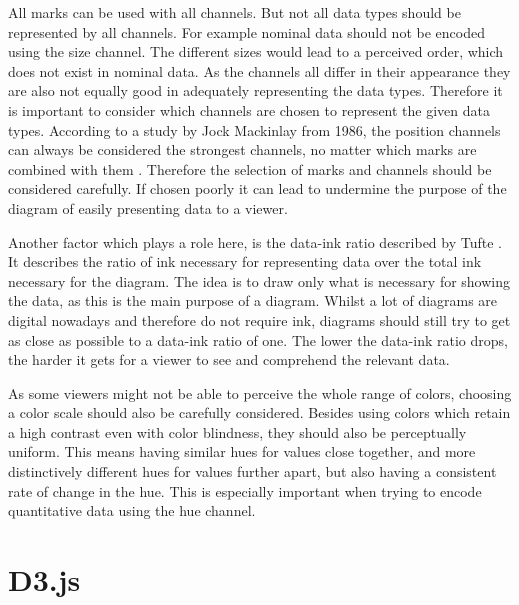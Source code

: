 All marks can be used with all channels. But not all data types should be represented by all channels. For example nominal data should not be encoded using the size channel. The different sizes would lead to a perceived order, which does not exist in nominal data. As the channels all differ in their appearance they are also not equally good in adequately representing the data types. Therefore it is important to consider which channels are chosen to represent the given data types. According to a study by Jock Mackinlay from 1986, the position channels can always be considered the strongest channels, no matter which marks are combined with them \cite{mackinlay1986automating}. Therefore the selection of marks and channels should be considered carefully. If chosen poorly it can lead to undermine the purpose of the diagram of easily presenting data to a viewer.

Another factor which plays a role here, is the data-ink ratio described by Tufte \cite{tufte}. It describes the ratio of ink necessary for representing data over the total ink necessary for the diagram. The idea is to draw only what is necessary for showing the data, as this is the main purpose of a diagram. Whilst a lot of diagrams are digital nowadays and therefore do not require ink, diagrams should still try to get as close as possible to a data-ink ratio of one. The lower the data-ink ratio drops, the harder it gets for a viewer to see and comprehend the relevant data.

As some viewers might not be able to perceive the whole range of colors, choosing a color scale should also be carefully considered. Besides using colors which retain a high contrast even with color blindness, they should also be perceptually uniform. This means having similar hues for values close together, and more distinctively different hues for values further apart, but also having a consistent rate of change in the hue. This is especially important when trying to encode quantitative data using the hue channel.


\section{D3.js}\label{sec:d3}


